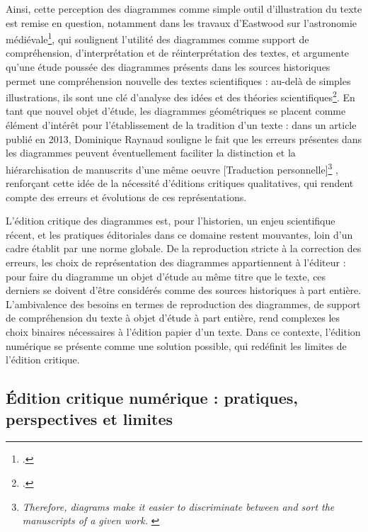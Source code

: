     Ainsi, cette perception des diagrammes comme simple outil d'illustration du texte est remise en question, notamment dans les travaux d'Eastwood sur l'astronomie médiévale\footcite{eastwoodPlanetaryDiagramsRoman2004}, qui soulignent l'utilité des diagrammes comme support de compréhension, d'interprétation et de réinterprétation des textes, et argumente qu'une étude poussée des diagrammes présents dans les sources historiques permet une compréhension nouvelle des textes scientifiques : au-delà de simples illustrations, ils sont une clé d'analyse des idées et des théories scientifiques\footcite{jardineCriticalEditingEarlyModern2010}. En tant que nouvel objet d'étude, les diagrammes géométriques se placent comme élément d'intérêt pour l'établissement de la tradition d'un texte : dans un article publié en 2013, Dominique Raynaud souligne le fait que les erreurs présentes dans les diagrammes peuvent éventuellement \og faciliter la distinction et la hiérarchisation de manuscrits d'une même oeuvre [Traduction personnelle]\footnote{\textit{\og Therefore, diagrams make it easier to discriminate between and sort the manuscripts of a given work. \fg}\cite{raynaudBuildingStemmaCodicum2014}} \fg , renforçant cette idée de la nécessité d'éditions critiques qualitatives, qui rendent compte des erreurs et évolutions de ces représentations.
    
    L'édition critique des diagrammes est, pour l'historien, un enjeu scientifique récent, et les pratiques éditoriales dans ce domaine restent mouvantes, loin d'un cadre établit par une norme globale. De la reproduction stricte à la correction des erreurs, les choix de représentation des diagrammes appartiennent à l'éditeur : pour faire du diagramme un objet d'étude au même titre que le texte, ces derniers se doivent d'être considérés comme des sources historiques à part entière. L'ambivalence des besoins en termes de reproduction des diagrammes, de support de compréhension du texte à objet d'étude à part entière, rend complexes les choix binaires nécessaires à l'édition papier d'un texte. Dans ce contexte, l'édition numérique se présente comme une solution possible, qui redéfinit les limites de l'édition critique.
    
    \subsection{Édition critique numérique : pratiques, perspectives et limites}
